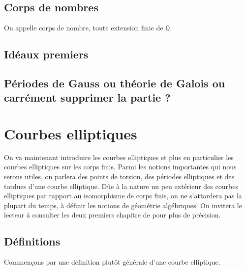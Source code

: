 \documentclass[a4paper]{article} %
\numberwithin{section}{part}
\numberwithin{equation}{section}
\newcommand\GF[1]{\mathbb{F}_{#1}}
\newcommand\QQ{\mathbb{Q}}
\begin{document}
\subsection{Corps de nombres}
On appelle corps de nombre, toute extension finie de $\QQ$.

\subsection{Idéaux premiers}

\subsection[Peut-être à virer]{Périodes de Gauss ou théorie de Galois ou 
carrément supprimer la partie ?}

\section{Courbes elliptiques}
On va maintenant introduire les courbes elliptiques et plus en particulier les
courbes elliptiques sur les corps finis. Parmi les notions importantes qui nous
serons utiles, on parlera des points de torsion, des périodes elliptiques et des
tordues d'une courbe elliptique. Dûe à la nature un peu extérieur des courbes
elliptiques par rapport au isomorphisme de corps finis, on ne s'attardera pas 
la plupart du temps, à définir les notions de géométrie algébriques. On invitera
le lecteur à consulter les deux premiers chapitre de \cite{Sil} pour plus de
précision.

\subsection{Définitions}
Commençons par une définition plutôt générale d'une courbe elliptique.
\end{document}
